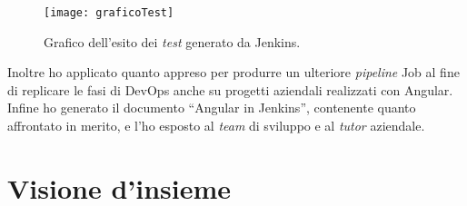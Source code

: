 \begin{figure}[htbp] 
    \centering 
    \texttt{[image: graficoTest]} 
    \caption{Grafico dell'esito dei \emph{test} generato da Jenkins.}
    \label{fig:graficoTest}
\end{figure}
\noindent Inoltre ho applicato quanto appreso per produrre un ulteriore \emph{pipeline} Job al fine di replicare le fasi di \gls{DevOps} anche su progetti aziendali realizzati con Angular.\\
Infine ho generato il documento “Angular in Jenkins”, contenente quanto affrontato in merito, e l'ho esposto al \emph{team} di sviluppo e al \emph{\emph{tutor}} aziendale. 



\section{Visione d'insieme}%
